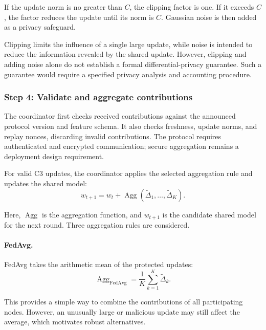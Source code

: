 \documentclass[11pt,a4paper]{article}
\begin{document}
If the update norm is no greater than $C$, the clipping factor is
one. If it exceeds $C$, the factor reduces the update until its norm
is $C$. Gaussian noise is then added as a privacy safeguard.

Clipping limits the influence of a single large update, while noise
is intended to reduce the information revealed by the shared update.
However, clipping and adding noise alone do not establish a formal
differential-privacy guarantee. Such a guarantee would require a
specified privacy analysis and accounting procedure.

\subsubsection{Step 4: Validate and aggregate contributions}

The coordinator first checks received contributions against the
announced protocol version and feature schema. It also checks
freshness, update norms, and replay nonces, discarding invalid
contributions. The protocol requires authenticated and encrypted
communication; secure aggregation remains a deployment design
requirement.

For valid C3 updates, the coordinator applies the selected aggregation
rule and updates the shared model:
\begin{equation}
w_{t+1}
=
w_t+
\operatorname{Agg}\!\left(
\widetilde{\Delta}_1,\ldots,
\widetilde{\Delta}_K
\right).
\label{eq:protocol-model-aggregation}
\end{equation}

Here, $\operatorname{Agg}$ is the aggregation function, and
$w_{t+1}$ is the candidate shared model for the next round. Three
aggregation rules are considered.

\paragraph{FedAvg.}

FedAvg takes the arithmetic mean of the protected updates:
\begin{equation}
\operatorname{Agg}_{\mathrm{FedAvg}}
=
\frac{1}{K}\sum_{k=1}^{K}
\widetilde{\Delta}_k.
\label{eq:protocol-fedavg}
\end{equation}

This provides a simple way to combine the contributions of all
participating nodes. However, an unusually large or malicious update
may still affect the average, which motivates robust alternatives.
\end{document}
